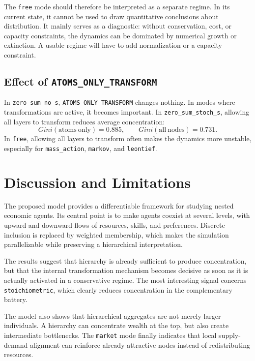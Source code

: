 \documentclass[11pt]{article}
\begin{document}
The \texttt{free} mode should therefore be interpreted as a separate regime. In its current state, it cannot be used to draw quantitative conclusions about distribution. It mainly serves as a diagnostic: without conservation, cost, or capacity constraints, the dynamics can be dominated by numerical growth or extinction. A usable regime will have to add normalization or a capacity constraint.

\subsection{Effect of \texttt{ATOMS\_ONLY\_TRANSFORM}}

In \texttt{zero\_sum\_no\_s}, \texttt{ATOMS\_ONLY\_TRANSFORM} changes nothing. In modes where transformations are active, it becomes important. In \texttt{zero\_sum\_stoch\_s}, allowing all layers to transform reduces average concentration:
\begin{equation}
    Gini(\mathrm{atoms\ only}) = 0.885,
    \qquad
    Gini(\mathrm{all\ nodes}) = 0.731.
\end{equation}
In \texttt{free}, allowing all layers to transform often makes the dynamics more unstable, especially for \texttt{mass\_action}, \texttt{markov}, and \texttt{leontief}.

\section{Discussion and Limitations}

The proposed model provides a differentiable framework for studying nested economic agents. Its central point is to make agents coexist at several levels, with upward and downward flows of resources, skills, and preferences. Discrete inclusion is replaced by weighted membership, which makes the simulation parallelizable while preserving a hierarchical interpretation.

The results suggest that hierarchy is already sufficient to produce concentration, but that the internal transformation mechanism becomes decisive as soon as it is actually activated in a conservative regime. The most interesting signal concerns \texttt{stoichiometric}, which clearly reduces concentration in the complementary battery.

The model also shows that hierarchical aggregates are not merely larger individuals. A hierarchy can concentrate wealth at the top, but also create intermediate bottlenecks. The \texttt{market} mode finally indicates that local supply-demand alignment can reinforce already attractive nodes instead of redistributing resources.
\end{document}
